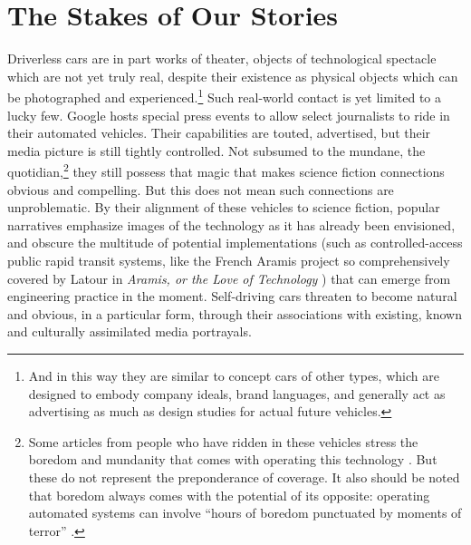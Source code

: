 \section{The Stakes of Our Stories}

Driverless cars
are in part works of theater, objects of technological spectacle which
are not yet truly real, despite their existence as physical objects
which can be photographed and experienced.\footnote{And in this way
  they are similar to concept cars of other types, which are designed
  to embody company ideals, brand languages, and generally act as
  advertising as much as design studies for actual future vehicles.}
Such real-world contact is 
yet limited to a lucky few. Google hosts special press events to allow
select journalists
to ride in their automated vehicles. Their capabilities are touted,
advertised, but their media picture is still tightly controlled. Not subsumed
to the mundane, the quotidian,\footnote{Some articles from people
  who have ridden in these vehicles stress the
  boredom and mundanity that comes with operating this
  technology \cite{rode500}. But these do not represent the
  preponderance of coverage. It also should be noted that boredom
  always comes with the potential of its opposite: operating automated
systems can involve ``hours of boredom
punctuated by moments of terror'' \cite[p. 339]{sheridan}.} they still
possess that magic that 
makes science fiction connections obvious and compelling. But this
does not mean such connections are unproblematic. By
their alignment of these vehicles to science fiction, popular
narratives emphasize images of the technology as it has already been
envisioned, and obscure the multitude of potential implementations
(such as controlled-access public rapid transit systems, 
like the French Aramis
project so comprehensively covered by Latour in \emph{Aramis, or the
  Love of Technology} \cite{Aramis})
that can emerge from engineering practice in the moment. Self-driving
cars threaten to become natural and obvious, in a particular form,
through their associations with existing, known and culturally
assimilated media portrayals. 



